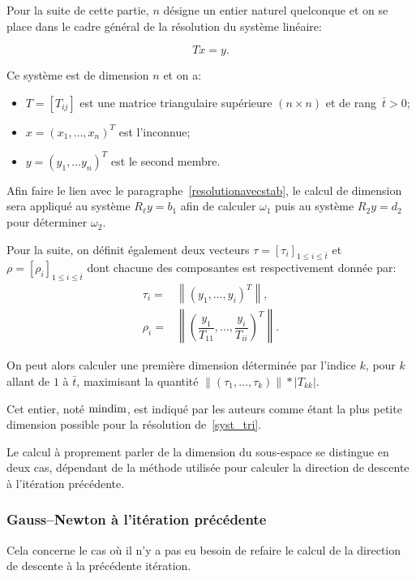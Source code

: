 Pour la suite de cette partie, $n$ désigne un entier naturel quelconque et on se place dans le cadre général de la résolution du système linéaire: 

\begin{equation}\label{syst_tri}
    Tx=y.
\end{equation}

Ce système est de dimension $n$ et on a:

\begin{itemize}
    \item $T = [T_{ij}]$ est une matrice triangulaire supérieure $(n \times n)$ et de rang~$\bar{t}>0$;
    \item $x = (x_1,\ldots,x_n)^T$ est l'inconnue;
    \item $y =(y_1,\ldots y_n)^T$ est le second membre.
\end{itemize}

Afin faire le lien avec le paragraphe~\ref{resolutionavecstab}, le calcul de dimension sera appliqué au système $R_{\ell}y=b_{1}$ afin de calculer $\omega_1$ puis au
système $R_{2}y =d_2$ pour déterminer $\omega_2$.

Pour la suite, on définit également deux vecteurs $\tau = [\tau_i]_{1\leq i\leq \bar{t}}$ et $\rho =[\rho_i]_{1\leq i\leq \bar{t}}$ dont chacune des composantes est respectivement donnée par:
\begin{align}
    \tau_i =& \left\|(y_1,\ldots,y_i)^T\right\|, \\
    \rho_i =& \left\|\left(\dfrac{y_1}{T_{11}},\ldots,\dfrac{y_i}{T_{ii}}\right)^T\right\|.
\end{align}


On peut alors calculer une première dimension déterminée par l'indice $k$, pour $k$ allant de $1$ à $\bar{t}$, maximisant la quantité $\|(\tau_1,\ldots,\tau_k)\|*|T_{kk}|$.

Cet entier, noté $\text{mindim}$, est indiqué par les auteurs comme étant la plus petite dimension possible pour la résolution de~\eqref{syst_tri}.

Le calcul à proprement parler de la dimension du sous-espace se distingue en deux cas, dépendant de la méthode utilisée pour calculer la direction de descente à l'itération
précédente.

\subsubsection*{Gauss--Newton à l'itération précédente}

Cela concerne le cas où il n'y a pas eu besoin de refaire le calcul de la direction de descente à la précédente itération.

